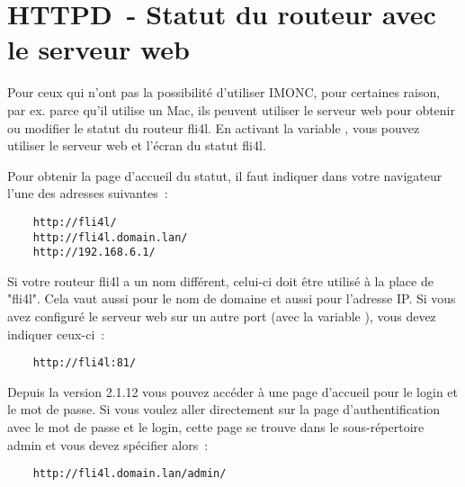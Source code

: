 
\section{HTTPD~- Statut du routeur avec le serveur web}


  Pour ceux qui n'ont pas la possibilité d'utiliser IMONC, pour certaines raison,
  par ex. parce qu'il utilise un Mac, ils peuvent utiliser le serveur web pour
  obtenir ou modifier le statut du routeur fli4l. En activant la variable
  , vous pouvez utiliser le serveur web et l'écran du
  statut fli4l. 

  Pour obtenir la page d'accueil du statut, il faut indiquer dans votre
  navigateur l'une des adresses suivantes~:

\begin{example}
\begin{verbatim}
    http://fli4l/
    http://fli4l.domain.lan/
    http://192.168.6.1/
\end{verbatim}
\end{example}

  Si votre routeur fli4l a un nom différent, celui-ci doit être utilisé à
  la place de "fli4l". Cela vaut aussi pour le nom de domaine et aussi pour
  l'adresse IP. Si vous avez configuré le serveur web sur un autre port
  (avec la variable ), vous devez indiquer ceux-ci~:

\begin{example}
\begin{verbatim}
    http://fli4l:81/
\end{verbatim}
\end{example}

  Depuis la version 2.1.12 vous pouvez accéder à une page d'accueil pour le
  login et le mot de passe. Si vous voulez aller directement sur la page
  d'authentification avec le mot de passe et le login, cette page se trouve
  dans le sous-répertoire admin et vous devez spécifier alors~:

\begin{example}
\begin{verbatim}
    http://fli4l.domain.lan/admin/
\end{verbatim}
\end{example}

